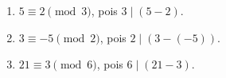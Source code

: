 \documentclass{beamer}
\begin{document}
    \begin{frame}
        \begin{exemplos}
            \begin{enumerate}[label={\arabic*})]
                \item $5\equiv 2 \pmod{3}$, pois $3 \mid (5 - 2)$.\pause \vspace{.3cm}
                \item $3\equiv -5 \pmod{2}$, pois $2\mid (3 - (-5))$.\pause \vspace{.3cm}
                \item $21\equiv 3 \pmod{6}$, pois $6\mid (21 - 3)$.\pause \vspace{.3cm}
            \end{enumerate}
        \end{exemplos}
    \end{frame}
\end{document}
